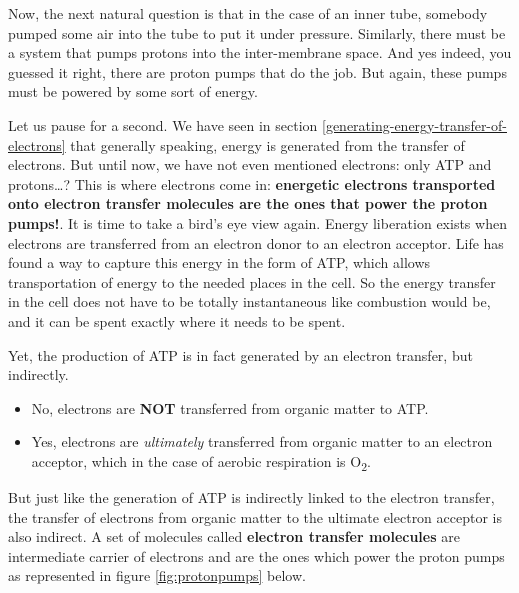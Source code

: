 \documentclass[]{book}
\providecommand{\tightlist}{%
  \setlength{\itemsep}{0pt}\setlength{\parskip}{0pt}}
\theoremstyle{definition}
\theoremstyle{definition}
\theoremstyle{definition}
\theoremstyle{remark}
\begin{document}
Now, the next natural question is that in the case of an inner tube,
somebody pumped some air into the tube to put it under pressure.
Similarly, there must be a system that pumps protons into the
inter-membrane space. And yes indeed, you guessed it right, there are
proton pumps that do the job. But again, these pumps must be powered by
some sort of energy.

Let us pause for a second. We have seen in section
\ref{generating-energy-transfer-of-electrons} that generally speaking,
energy is generated from the transfer of electrons. But until now, we
have not even mentioned electrons: only ATP and protons\ldots{}? This is
where electrons come in: \textbf{energetic electrons transported onto
electron transfer molecules are the ones that power the proton pumps!}.
It is time to take a bird's eye view again. Energy liberation exists
when electrons are transferred from an electron donor to an electron
acceptor. Life has found a way to capture this energy in the form of
ATP, which allows transportation of energy to the needed places in the
cell. So the energy transfer in the cell does not have to be totally
instantaneous like combustion would be, and it can be spent exactly
where it needs to be spent.

Yet, the production of ATP is in fact generated by an electron transfer,
but indirectly.

\begin{itemize}
\tightlist
\item
  No, electrons are \textbf{NOT} transferred from organic matter to ATP.
\item
  Yes, electrons are \emph{ultimately} transferred from organic matter
  to an electron acceptor, which in the case of aerobic respiration is
  O\textsubscript{2}.
\end{itemize}

But just like the generation of ATP is indirectly linked to the electron
transfer, the transfer of electrons from organic matter to the ultimate
electron acceptor is also indirect. A set of molecules called
\textbf{electron transfer molecules} are intermediate carrier of
electrons and are the ones which power the proton pumps as represented
in figure \ref{fig:protonpumps} below.
\end{document}
